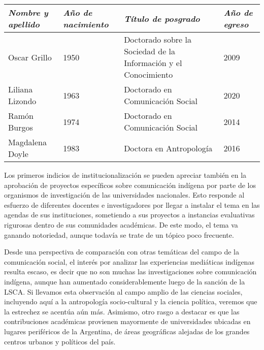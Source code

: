\documentclass{tufte-handout}
\begin{document}
\begin{fullwidth}
    

\begin{table}[ht]
\caption{}\label{n2zyn6pw6v2}
\begin{tabular}{@{}p{}p{}p{}p{}@{}}
\emph{Nombre y apellido} & \emph{Año de nacimiento} & \emph{Título de posgrado} & \emph{Año de egreso} \\ [.2in]
\midrule
\addlinespace[.2in]
Oscar Grillo & 1950 & Doctorado sobre la Sociedad de la Información y el Conocimiento & 2009 \\ 
\addlinespace[.1in]
Liliana Lizondo & 1963 & Doctorado en Comunicación Social & 2020 \\
\addlinespace[.1in]
Ramón Burgos & 1974 & Doctorado en Comunicación Social & 2014 \\
\addlinespace[.1in]
Magdalena Doyle & 1983 & Doctora en Antropología & 2016 \\
\end{tabular}
\end{table}

\end{fullwidth}

\vspace{.3in}


Los primeros indicios de institucionalización se pueden apreciar también
en la aprobación de proyectos específicos sobre comunicación indígena
por parte de los organismos de investigación de las universidades
nacionales. Esto responde al esfuerzo de diferentes docentes e
investigadores por llegar a instalar el tema en las agendas de sus
instituciones, sometiendo a sus proyectos a instancias evaluativas
rigurosas dentro de sus comunidades académicas. De este modo, el tema va
ganando notoriedad, aunque todavía se trate de un tópico poco frecuente.

Desde una perspectiva de comparación con otras temáticas del campo de la
comunicación social, el interés por analizar las experiencias mediáticas
indígenas resulta escaso, es decir que no son muchas las investigaciones
sobre comunicación indígena, aunque han aumentado considerablemente
luego de la sanción de la LSCA. Si llevamos esta observación al campo
amplio de las ciencias sociales, incluyendo aquí a la antropología
socio-cultural y la ciencia política, veremos que la estrechez se
acentúa aún más. Asimismo, otro rasgo a destacar es que las
contribuciones académicas provienen mayormente de universidades ubicadas
en lugares periféricos de la Argentina, de áreas geográficas alejadas de
los grandes centros urbanos y políticos del país.
\end{document}

